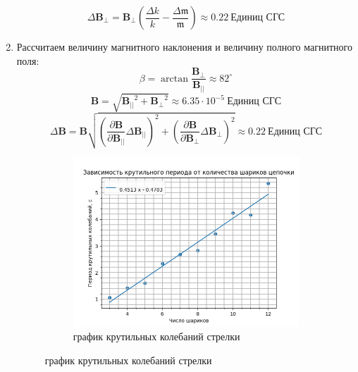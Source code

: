 \documentclass[a4paper, 12pt]{article}
\begin{document}
\begin{enumerate}
\begin{equation*}
    \end{equation*}
    \begin{equation*}
        \Delta \mathbf{B_{\perp}} = \mathbf{B_{\perp}}\left(\frac{\Delta k}{k} - \frac{\Delta \mathfrak{m}}{\mathfrak{m}}\right) \approx 0.22\ \text{Единиц СГС}
    \end{equation*}
    \item Рассчитаем величину магнитного наклонения и величину полного магнитного поля:
    \begin{equation*}
            \beta = \arctan{\frac{\mathbf{B_{\perp}}}{\mathbf{B_{||}}}} \approx 82^\circ
    \end{equation*}
    \begin{equation*}
        \mathbf{B} = \sqrt{\mathbf{B_{||}}^{2} + \mathbf{B_{\perp}}^{2}} \approx 6.35\cdot 10^{-5}\ \text{Единиц СГС}
    \end{equation*}
    \begin{equation*}
        \Delta \mathbf{B} = \mathbf{B}\sqrt{\left(\frac{\partial \mathbf{B}}{\partial \mathbf{B_{||}}}\Delta \mathbf{B_{||}}\right)^{2} + \left(\frac{\partial \mathbf{B}}{\partial \mathbf{B_{\perp}}}\Delta \mathbf{B_{\perp}}\right)^{2}} \approx 0.22\ \text{Единиц СГС}
    \end{equation*}
    \begin{figure}[htbp]
        \centering
        \begin{subfigure}{0.7\textwidth}
            \centering
            \includegraphics[width=\linewidth]{period.png}
            \caption{график крутильных колебаний стрелки}
            \label{горизонтальная составляющая}
        \end{subfigure}

\end{figure}
\end{enumerate}
\end{document}
